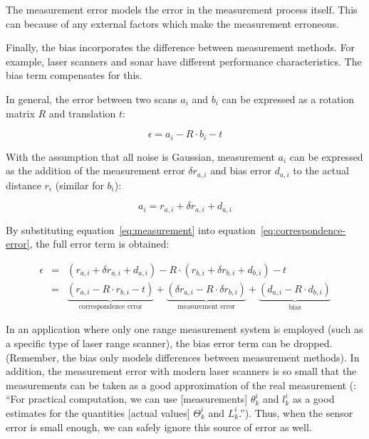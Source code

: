 The measurement error models the error in the measurement process itself. This can because of any external factors which make the measurement erroneous. 

Finally, the bias incorporates the difference between measurement methods. For example, laser scanners and sonar have different performance characteristics. The bias term compensates for this.

In general, the error between two scans $a_i$ and $b_i$ can be expressed as a rotation matrix $R$ and translation $t$:

\begin{equation}
\label{eq:correspondence-error}
\epsilon = a_i - R \cdot b_i - t
\end{equation}

With the assumption that all noise is Gaussian, measurement $a_i$ can be expressed as the addition of the measurement error $\delta r_{a, i}$ and bias error $d_{a, i}$  to the actual distance $r_i$ (similar for $b_i$):

\begin{equation}
\label{eq:measurement}
a_i = r_{a,i} + \delta r_{a, i} + d_{a, i}
\end{equation}

By substituting equation~\ref{eq:measurement} into equation~\ref{eq:correspondence-error}, the full error term is obtained:

\begin{eqnarray}
\label{eq:wsm}
\epsilon &=& (r_{a,i} + \delta r_{a, i} + d_{a, i}) - R \cdot (r_{b,i} + \delta r_{b, i} + d_{b, i}) - t
			 \nonumber \\
         &=& \underbrace{(r_{a, i} - R \cdot r_{b, i} - t)}_\text{correspondence error} + 
             \underbrace{(\delta r_{a, i} - R \cdot \delta r_{b, i})}_\text{measurement error} + 
             \underbrace{(d_{a, i} - R \cdot d_{b, i})}_\text{bias}
\end{eqnarray}

In an application where only one range measurement system is employed (such as a specific type of laser range scanner), the bias error term can be dropped. (Remember, the bias only models differences between measurement methods). In addition, the measurement error with modern laser scanners is so small that the measurements can be taken as a good approximation of the real measurement (\cite{pfister2002weighted}: ``For practical computation, we can use [measurements] $\theta^i_k$ and $l^i_k$ as a good estimates for the quantities [actual values] $\Theta^i_k$ and $L^i_k$.''). Thus, when the sensor error is small enough, we can safely ignore this source of error as well. 

